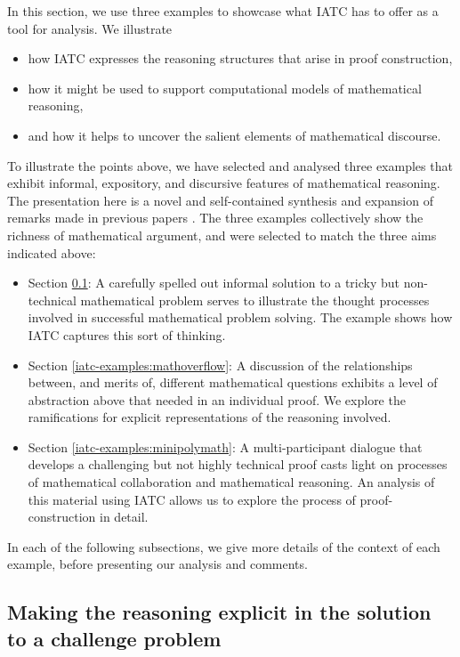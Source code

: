 \documentclass[smallextended,oneside]{svjour3}       %
\let\cite\citep
\newcommand\nothing[1]{#1}
\let\thesis\nothing
\begin{document}
\thesis{In this section, we use three examples to showcase what IATC has to offer as a tool for analysis.}
We illustrate
\begin{itemize}
\item how IATC expresses the reasoning structures that arise in proof construction,
\item how it might be used to support computational models of mathematical reasoning,
\item and how it helps to uncover the salient elements of mathematical discourse.
\end{itemize}
To illustrate the points above, we have selected and analysed three examples
that exhibit informal, expository, and discursive features of mathematical reasoning.
The presentation here is a novel and self-contained synthesis and expansion of
remarks made in previous papers
\cite{corneli2017towards,corneli2017modelling,pease-and-martin}.
The three examples collectively show the richness of mathematical argument, and were selected
to match the three aims indicated above:
\begin{itemize}
\item Section \ref{iatc-examples:gowers}: A carefully spelled out informal solution to a tricky but non-technical mathematical problem serves to  illustrate the thought processes involved in successful mathematical problem solving.  The example shows how IATC captures this sort of thinking.
\item Section \ref{iatc-examples:mathoverflow}: A discussion of the relationships between, and merits of, different mathematical questions exhibits a level of abstraction above that needed in an individual proof.  We explore the ramifications for explicit representations of the reasoning involved.
\item Section \ref{iatc-examples:minipolymath}: A multi-participant dialogue that develops a challenging but not highly technical proof  casts light on processes of mathematical collaboration and mathematical reasoning.  An analysis of this material using IATC allows us to explore the process of proof-construction in detail.
\end{itemize}
In each of the following subsections, we give more details of the
context of each example, before presenting our analysis and comments.



\subsection{Making the reasoning explicit in the solution to a challenge problem}\label{iatc-examples:gowers}
\end{document}
